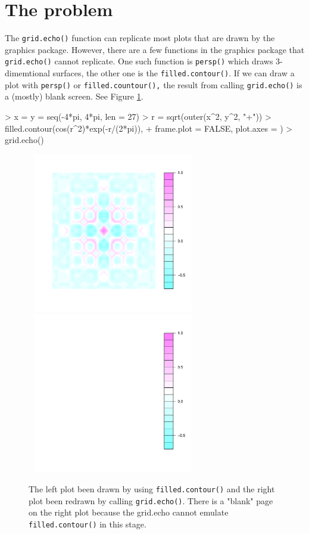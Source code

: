 \documentclass[11pt,twoside]{report}
\begin{document}
\section{The problem}
The \texttt{grid.echo()} function can replicate most plots that are drawn by the graphics package. However, there are a few functions in the graphics package that \texttt{grid.echo()} cannot replicate. One such function is \texttt{persp()} which draws 3-dimemtional surfaces, the other one is the \texttt{filled.contour()}. If we can draw a plot with \texttt{persp()} or \texttt{filled.countour(),} the result from calling \texttt{grid.echo()} is a (mostly) blank screen. See Figure \ref{figure_1.3}.
\begin{Schunk}
\begin{Sinput}
> x = y = seq(-4*pi, 4*pi, len = 27)
> r = sqrt(outer(x^2, y^2, "+"))
> filled.contour(cos(r^2)*exp(-r/(2*pi)), 
+                frame.plot = FALSE, plot.axes = {})
> grid.echo()
\end{Sinput}
\end{Schunk}
\begin{figure}[h]
	\begin{center}
		\includegraphics[height = 7cm, width = 7.5cm]{figure/report_fill_1}
		\includegraphics[height = 7cm, width = 7.5cm]{figure/report_fill_2}
		\caption{The left plot been drawn by using \texttt{filled.contour()} and the right plot been redrawn by calling \texttt{grid.echo()}. There is a "blank" page on the right plot because the grid.echo cannot emulate \texttt{filled.contour()} in this stage.}
		\label{figure_1.3}
	\end{center}
\end{figure}
\end{document}
